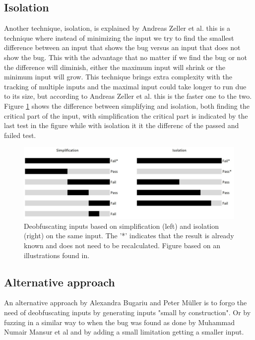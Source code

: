\subsection{Isolation}
\label{cha:3:Isolation}
Another technique, isolation, is explained by Andreas Zeller et al. 
\cite{5zeller2002simplifyingIsolatingFailure-inducing} this is a technique where instead of minimizing the input we try to find the smallest difference between an input that shows the bug versus an input that does not show the bug. This with the advantage that no matter if we find the bug or not the difference will diminish, either the maximum input will shrink or the minimum input will grow. This technique brings extra complexity with the tracking of multiple inputs and the maximal input could take longer to run due to its size, but according to Andreas Zeller et al. this is the faster one to the two. Figure
\ref{fig:simplificationIsolation} shows the difference between simplifying and isolation, both finding the critical part of the input, with simplification the critical part is indicated by the last test in the figure while with isolation it it the differenc of the passed and failed test.
\begin{figure}
	\centering
	\includegraphics[width=1.0\textwidth]{images/simplificationIsolation}
	\caption{Deobfuscating inputs based on simplification (left) and isolation (right) on the same input. The '*' indicates that the result is already known and does not need to be recalculated. Figure based on an illustrations found in\cite{bookZellerwhyProgramsFail}.}
	\label{fig:simplificationIsolation}
\end{figure}

\subsection{Alternative approach}
An alternative approach by Alexandra Bugariu and Peter M\"uller\cite{9bugariu2020automaticallyTestingStringSolvers} is to forgo the need of deobfuscating inputs by generating inputs "small by construction". Or by fuzzing in a similar way to when the bug was found as done by Muhammad Numair Mansur et al\cite{1mansur2020detecting} and by adding a small limitation getting a smaller input.


